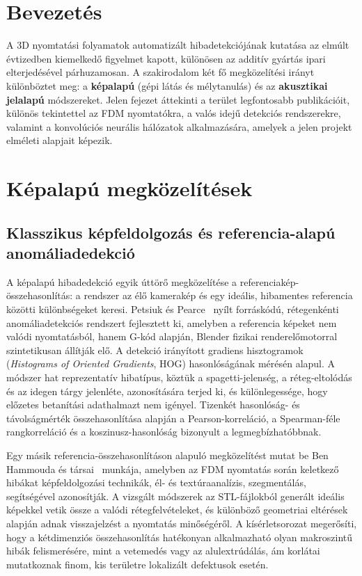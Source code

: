 \section{Bevezetés}

A 3D nyomtatási folyamatok automatizált hibadetekciójának kutatása az elmúlt évtizedben kiemelkedő
figyelmet kapott, különösen az additív gyártás ipari elterjedésével párhuzamosan. A szakirodalom
két fő megközelítési irányt különböztet meg: a \textbf{képalapú} (gépi látás és mélytanulás) és az
\textbf{akusztikai jelalapú} módszereket. Jelen fejezet áttekinti a terület legfontosabb publikációit,
különös tekintettel az FDM nyomtatókra, a valós idejű detekciós rendszerekre, valamint a
konvolúciós neurális hálózatok alkalmazására, amelyek a jelen projekt elméleti alapjait képezik.

\section{Képalapú megközelítések}

    \subsection{Klasszikus képfeldolgozás és referencia-alapú anomáliadedekció}

    A képalapú hibadedekció egyik úttörő megközelítése a referenciakép-összehasonlítás: a
    rendszer az élő kamerakép és egy ideális, hibamentes referencia közötti különbségeket keresi.
    Petsiuk és Pearce~\cite{petsiuk2021hog} nyílt forráskódú, rétegenkénti anomáliadetekciós
    rendszert fejlesztett ki, amelyben a referencia képeket nem valódi nyomtatásból, hanem
    G-kód alapján, Blender fizikai renderelőmotorral szintetikusan állítják elő. A detekció
    irányított gradiens hisztogramok (\textit{Histograms of Oriented Gradients}, HOG) hasonlóságának
    mérésén alapul. A módszer hat reprezentatív hibatípus, köztük a spagetti-jelenség, a
    réteg-eltolódás és az idegen tárgy jelenléte, azonosítására terjed ki, és különlegessége,
    hogy előzetes betanítási adathalmazt nem igényel. Tizenkét hasonlóság- és távolságmérték
    összehasonlítása alapján a Pearson-korreláció, a Spearman-féle rangkorreláció és a koszinusz-hasonlóság
    bizonyult a legmegbízhatóbbnak.

    Egy másik referencia-összehasonlításon alapuló megközelítést mutat be Ben Hammouda és
    társai~\cite{benhammouda2024defect} munkája, amelyben az FDM nyomtatás során keletkező hibákat
    képfeldolgozási technikák, él- és textúraanalízis, szegmentálás, segítségével azonosítják.
    A vizsgált módszerek az STL-fájlokból generált ideális képekkel vetik össze a valódi rétegfelvételeket,
    és különböző geometriai eltérések alapján adnak visszajelzést a nyomtatás minőségéről.
    A kísérletsorozat megerősíti, hogy a kétdimenziós összehasonlítás hatékonyan alkalmazható
    olyan makroszintű hibák felismerésére, mint a vetemedés vagy az alulextrúdálás, ám korlátai
    mutatkoznak finom, kis területre lokalizált defektusok esetén.

